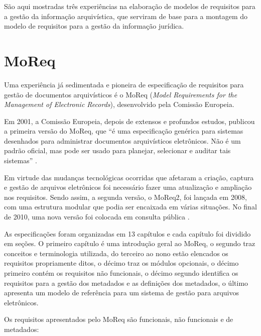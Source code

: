 \documentclass[a4paper,11pt,openright,twoside,english,brazil]{abntex2}
\begin{document}
São aqui mostradas três experiências na elaboração de modelos de requisitos
para a gestão da informação arquivística, que serviram de base para a montagem
do modelo de requisitos para a gestão da informação jurídica.

\section{MoReq}

Uma experiência já sedimentada e pioneira de especificação de requisitos para
gestão de documentos arquivísticos é o MoReq (\emph{Model Requirements for the
Management of Electronic Records}), desenvolvido pela Comissão Europeia.

Em 2001, a Comissão Europeia, depois de extensos e profundos estudos, publicou a
primeira versão do MoReq, que ``é uma especificação genérica para sistemas
desenhados para administrar documentos arquivísticos eletrônicos. Não é um
padrão oficial, mas pode ser usado para planejar, selecionar e auditar tais
sistemas'' \cite{piers2003}.

Em virtude das mudanças tecnológicas ocorridas que afetaram a criação, captura e
gestão de arquivos eletrônicos foi necessário fazer uma atualização e ampliação
nos requisitos. Sendo assim, a segunda versão, o MoReq2, foi lançada em 2008,
com uma estrutura modular que podia ser encaixada em várias situações. No final
de 2010, uma nova versão foi colocada em consulta pública \cite{european2008}.

As especificações foram organizadas em 13 capítulos e cada capítulo foi dividido
em seções. O primeiro capítulo é uma introdução geral ao MoReq, o segundo traz
conceitos e terminologia utilizada, do terceiro ao nono estão elencados os
requisitos propriamente ditos, o décimo traz os módulos opcionais, o décimo
primeiro contém os requisitos não funcionais, o décimo segundo identifica os
requisitos para a gestão dos metadados e as definições dos metadados, o último
apresenta um modelo de referência para um sistema de gestão para arquivos
eletrônicos.

Os requisitos apresentados pelo MoReq são funcionais, não funcionais e de
metadados:
\end{document}
